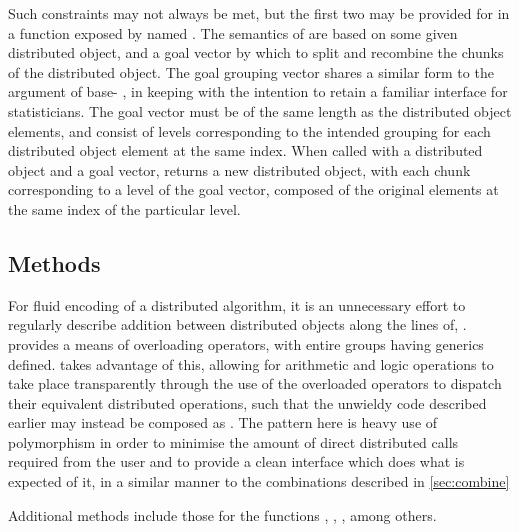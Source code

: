 Such constraints may not always be met, but the first two may be provided for in a function exposed by \lsr{} named .
The semantics of  are based on some given distributed object, and a goal vector by which to split and recombine the chunks of the distributed object.
The goal grouping vector shares a similar form to the  argument of base-\R{} , in keeping with the intention to retain a familiar \R{} interface for statisticians.
The goal vector must be of the same length as the distributed object elements, and consist of levels corresponding to the intended grouping for each distributed object element at the same index.
When called with a distributed object and a goal vector,  returns a new distributed object, with each chunk corresponding to a level of the goal vector, composed of the original elements at the same index of the particular level.

\subsection{Methods}

For fluid encoding of a distributed algorithm, it is an unnecessary effort to regularly describe addition between distributed objects along the lines of, .
\R{} provides a means of overloading operators, with entire groups having generics defined.
\lsr{} takes advantage of this, allowing for arithmetic and logic operations to take place transparently through the use of the overloaded operators to dispatch their equivalent distributed operations, such that the unwieldy code described earlier may instead be composed as .
The pattern here is heavy use of polymorphism in order to minimise the amount of direct distributed calls required from the user and to provide a clean interface which does what is expected of it, in a similar manner to the combinations described in \cref{sec:combine}

Additional methods include those for the functions , , , among others.

